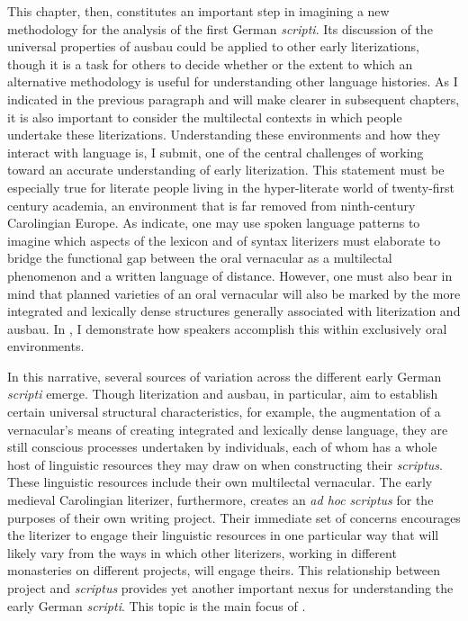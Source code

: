 This chapter, then, constitutes an important step in imagining a new methodology for the analysis of the first German \textit{scripti}. Its discussion of the universal properties of ausbau could be applied to other early literizations, though it is a task for others to decide whether or the extent to which an alternative methodology is useful for understanding other language histories. As I indicated in the previous paragraph and will make clearer in subsequent chapters, it is also important to consider the multilectal contexts in which people undertake these literizations. Understanding these environments and how they interact with language is, I submit, one of the central challenges of working toward an accurate understanding of early literization. This statement must be especially true for literate people living in the hyper-literate world of twenty-first century academia, an environment that is far removed from ninth-century Carolingian Europe. As \citet{KochOesterreicher1994} indicate, one may use spoken language patterns to imagine which aspects of the lexicon and of syntax literizers must elaborate to bridge the functional gap between the oral vernacular as a multilectal phenomenon and a written language of distance. However, one must also bear in mind that planned varieties of an oral vernacular will also be marked by the more integrated and lexically dense structures generally associated with literization and ausbau. In , I demonstrate how speakers accomplish this within exclusively oral environments.

  In this narrative, several sources of variation across the different early German \textit{scripti} emerge. Though literization and ausbau, in particular, aim to establish certain universal structural characteristics, for example, the augmentation of a vernacular’s means of creating integrated and lexically dense language, they are still conscious processes undertaken by individuals, each of whom has a whole host of linguistic resources they may draw on when constructing their \textit{scriptus}. These linguistic resources include their own multilectal vernacular. The early medieval Carolingian literizer, furthermore, creates an \textit{ad hoc} \textit{scriptus} for the purposes of their own writing project. Their immediate set of concerns encourages the literizer to engage their linguistic resources in one particular way that will likely vary from the ways in which other literizers, working in different monasteries on different projects, will engage theirs. This relationship between project and \textit{scriptus} provides yet another important nexus for understanding the early German \textit{scripti}. This topic is the main focus of .

